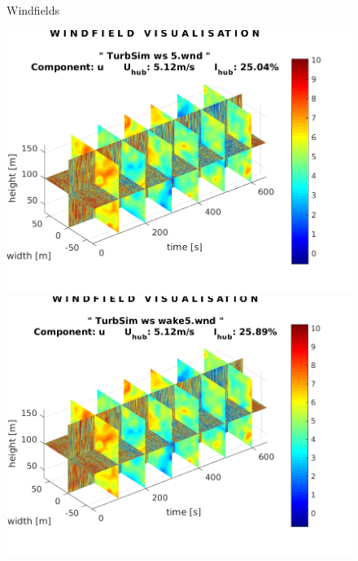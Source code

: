 \documentclass[12pt,t]{beamer}
\begin{document}
\begin{frame}

\begin{figure}[htb!]
\huge
Windfields\\[20pt]
\begin{minipage}{0.4\textwidth}
  \centering
  \includegraphics[width=1\linewidth]{../CIP_5/CIP_Tutorial_5_-_Windfield_and_wake_simulation/TurbSim/wind_5ms.png}
\end{minipage}
\begin{minipage}{0.4\textwidth}
  \centering
  \includegraphics[width=1\linewidth]{../CIP_5/CIP_Tutorial_5_-_Windfield_and_wake_simulation/TurbSim/wind_wake_4_5ms.png}
\end{minipage}
\end{figure}
\end{frame}
\end{document}
